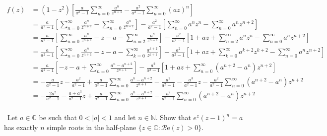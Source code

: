 \documentclass[12pt]{Homework}
\newcommand{\re}{\mathscr{R}\text{e}}
\begin{document}
\begin{solution}
\begin{align*}
    f(z)&=(1-z^2)\left[\frac{a}{a^2-1}\sum_{n=0}^\infty\frac{a^n}{z^{n+1}}-\frac{a^2}{a^2-1}\sum_{n=0}^\infty(az)^n\right]\\
    &=\frac{a}{a^2-1}\left[\sum_{n=0}^\infty\frac{a^n}{z^{n+1}}-\sum_{n=0}^\infty\frac{a^n}{z^{n-1}}\right]-\frac{a^2}{a^2-1}\left[\sum_{n=0}^\infty a^nz^n-\sum_{n=0}^\infty a^nz^{n+2}\right]\\
    &=\frac{a}{a^2-1}\left[\sum_{n=0}^\infty\frac{a^n}{z^{n+1}}-z-a-\sum_{n=2}^\infty\frac{a^n}{z^{n-1}}\right]-\frac{a^2}{a^2-1}\left[1+az+\sum_{n=2}^\infty a^nz^n-\sum_{n=0}^\infty a^nz^{n+2}\right]\\
    &=\frac{a}{a^2-1}\left[\sum_{n=0}^\infty\frac{a^n}{z^{n+1}}-z-a-\sum_{k=0}^\infty\frac{a^{k+2}}{z^{k+1}}\right]-\frac{a^2}{a^2-1}\left[1+az+\sum_{k=0}^\infty a^{k+2}z^{k+2}-\sum_{n=0}^\infty a^nz^{n+2}\right]\\
    &=\frac{a}{a^2-1}\left[-z-a+\sum_{n=0}^\infty\frac{a^n-a^{n+2}}{z^{n+1}}\right]-\frac{a^2}{a^2-1}\left[1+az+\sum_{n=0}^\infty (a^{n+2}-a^n)z^{n+2}\right]\\
    &=-\frac{a}{a^2-1}z-\frac{a^2}{a^2-1}+\frac{a}{a^2-1}\sum_{n=0}^\infty\frac{a^n-a^{n+2}}{z^{n+1}}-\frac{a^2}{a^2-1}-\frac{a^3}{a^2-1}z-\frac{a^2}{a^2-1}\sum_{n=0}^\infty (a^{n+2}-a^n)z^{n+2}\\
    &=-\frac{2a^2}{a^2-1}-\frac{a+a^3}{a^2-1}z+\frac{a}{a^2-1}\sum_{n=0}^\infty\frac{a^n-a^{n+2}}{z^{n+1}}-\frac{a^2}{a^2-1}\sum_{n=0}^\infty (a^{n+2}-a^n)z^{n+2}\\
\end{align*}
\end{solution}
\newpage



\begin{problem} $\,$
Let $a\in\mathbb{C}$ be such that $0<|a|<1$ and let $n\in\mathbb{N}$. Show that $e^z(z-1)^n=a$ has exactly $n$ simple roots in the half-plane $\{z\in\mathbb{C}:\re(z)>0\}.$
\end{problem}
\end{document}
